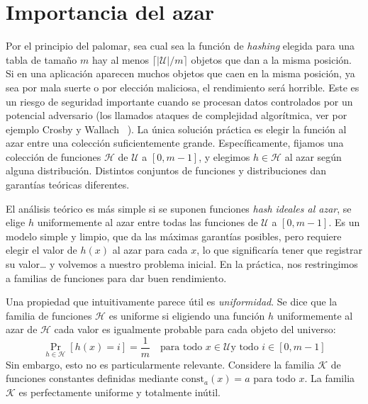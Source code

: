 \section{Importancia del azar}
\label{sec:azar-hash}

  Por el principio del palomar,
  sea cual sea la función de \emph{\foreignlanguage{english}{hashing}}
  elegida para una tabla de tamaño \(m\)
  hay al menos \(\lceil \lvert \mathscr{U} \rvert / m \rceil\) objetos
  que dan a la misma posición.
  Si en una aplicación aparecen muchos objetos que caen en la misma posición,
  ya sea por mala suerte o por elección maliciosa,
  el rendimiento será horrible.
  Este es un riesgo de seguridad importante
  cuando se procesan datos controlados
  por un potencial adversario
  (los llamados ataques de complejidad algorítmica,
   ver por ejemplo Crosby y Wallach~%
     \cite{crosby03:_DoS_algo_compl_attack}).
  La única solución práctica es elegir la función al azar
  entre una colección suficientemente grande.
  Específicamente,
  fijamos una colección de funciones \(\mathscr{H}\)
  de \(\mathscr{U}\) a \([0, m - 1]\),
  y elegimos \(h \in \mathscr{H}\) al azar según alguna distribución.
  Distintos conjuntos de funciones y distribuciones
  dan garantías teóricas diferentes.

  El análisis teórico es más simple
  si se suponen funciones \emph{\foreignlanguage{english}{hash}}
  \emph{ideales al azar},
  se elige \(h\) uniformemente al azar
  entre todas las funciones de \(\mathscr{U}\) a \([0, m - 1]\).
  Es un modelo simple y limpio,
  que da las máximas garantías posibles,
  pero requiere elegir el valor de \(h(x)\) al azar para cada \(x\),
  lo que significaría tener que registrar su valor\ldots{}
  y volvemos a nuestro problema inicial.
  En la práctica,
  nos restringimos a familias de funciones
  para dar buen rendimiento.

  Una propiedad que intuitivamente parece útil es \emph{uniformidad}.
  Se dice que la familia de funciones \(\mathscr{H}\) es uniforme
  si eligiendo una función \(h\) uniformemente al azar de \(\mathscr{H}\)
  cada valor es igualmente probable para cada objeto del universo:
  \begin{equation}
    \label{eq:hash-uniform}
    \Pr_{h \in \mathscr{H}}[ h(x) = i ]
      = \frac{1}{m}
      \quad\text{para todo \(x \in \mathscr{U}\)
                 y todo \(i \in [0, m - 1]\)}
  \end{equation}
  Sin embargo,
  esto no es particularmente relevante.
  Considere la familia \(\mathscr{K}\) de funciones constantes
  definidas mediante \(\mathrm{const}_a(x) = a\) para todo \(x\).
  La familia \(\mathscr{K}\) es perfectamente uniforme y totalmente inútil.

